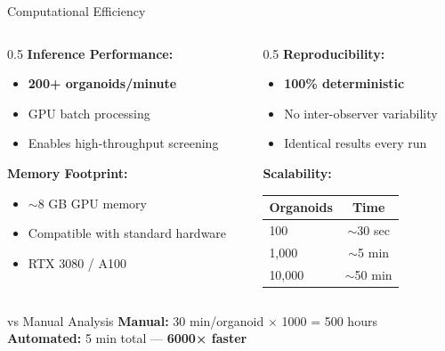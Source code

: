 \documentclass[aspectratio=169]{beamer}
\begin{document}
\begin{frame}{Computational Efficiency}
    \begin{columns}
        \begin{column}{0.5\textwidth}
            \textbf{Inference Performance:}
            \begin{itemize}
                \item \textbf{200+ organoids/minute}
                \item GPU batch processing
                \item Enables high-throughput screening
            \end{itemize}
            
            \vspace{0.5em}
            \textbf{Memory Footprint:}
            \begin{itemize}
                \item $\sim$8 GB GPU memory
                \item Compatible with standard hardware
                \item RTX 3080 / A100
            \end{itemize}
        \end{column}
        \begin{column}{0.5\textwidth}
            \textbf{Reproducibility:}
            \begin{itemize}
                \item \textbf{100\% deterministic}
                \item No inter-observer variability
                \item Identical results every run
            \end{itemize}
            
            \vspace{0.5em}
            \textbf{Scalability:}
            \begin{table}
                \footnotesize
                \begin{tabular}{lc}
                    \toprule
                    \textbf{Organoids} & \textbf{Time} \\
                    \midrule
                    100 & $\sim$30 sec \\
                    1,000 & $\sim$5 min \\
                    10,000 & $\sim$50 min \\
                    \bottomrule
                \end{tabular}
            \end{table}
        \end{column}
    \end{columns}
    
    \vspace{0.3em}
    \begin{block}{vs Manual Analysis}
        \textbf{Manual:} 30 min/organoid $\times$ 1000 = 500 hours\\
        \textbf{Automated:} 5 min total — \textbf{6000× faster}
    \end{block}
\end{frame}
\end{document}

